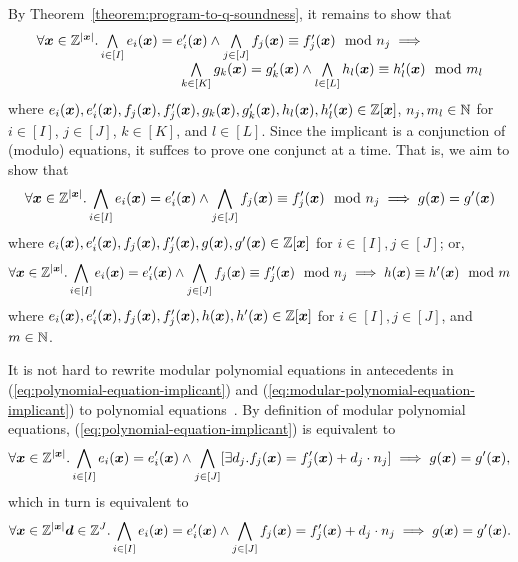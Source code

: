 
By Theorem~\ref{theorem:program-to-q-soundness}, it remains to show 
that 
\[
\begin{array}{l}
  \forall \vx \in \bbfZ^{|\vx|}.
  \bigwedge\limits_{i \in [I]} e_i (\vx) = e'_i (\vx) \wedge
  \bigwedge\limits_{j \in [J]} f_j (\vx) \equiv f'_j (\vx) \mod n_j
  \implies
  \\
  \hspace{.3\textwidth}
  \bigwedge\limits_{k \in [K]} g_k (\vx) = g'_k (\vx) \wedge
  \bigwedge\limits_{l \in [L]} h_l (\vx) \equiv h'_l (\vx) \mod m_l
\end{array}
\]
where
$e_i (\vx), e'_i (\vx), f_j (\vx), f'_j (\vx),
 g_k (\vx), g'_k (\vx), h_l (\vx), h'_l (\vx) \in
 \bbfZ[\vx]$, $n_j, m_l \in \mathbb{N}$ for $i \in [I]$, $j \in [J]$, $k
 \in [K]$, and $l \in [L]$. Since the
implicant is a conjunction of (modulo) equations, it suffces to 
prove one conjunct at a time. That is, we aim to show that 
\begin{equation}
  \label{eq:polynomial-equation-implicant}
  \forall \vx \in \bbfZ^{|\vx|}.
  \bigwedge\limits_{i \in [I]} e_i (\vx) = e'_i (\vx) \wedge
  \bigwedge\limits_{j \in [J]} f_j (\vx) \equiv f'_j (\vx) \mod n_j
  \implies
  g (\vx) = g' (\vx)
\end{equation}
where $e_i (\vx), e'_i (\vx), f_j (\vx), f'_j (\vx), g (\vx), g' (\vx)
\in \bbfZ[\vx]$ for $i \in [I], j \in [J]$; or, 
 \begin{equation}
   \label{eq:modular-polynomial-equation-implicant}
   \forall \vx \in \bbfZ^{|\vx|}.
   \bigwedge\limits_{i \in [I]} e_i (\vx) = e'_i (\vx) \wedge
   \bigwedge\limits_{j \in [J]} f_j (\vx) \equiv f'_j (\vx) \mod n_j
   \implies
   h (\vx) \equiv h' (\vx) \mod m
 \end{equation}
where $e_i (\vx), e'_i (\vx), f_j (\vx), f'_j (\vx), h (\vx), h' (\vx)
\in \bbfZ[\vx]$ for $i \in [I], j \in [J]$, and $m \in \mathbb{N}$. 

It is not hard to rewrite modular polynomial equations in antecedents
in (\ref{eq:polynomial-equation-implicant}) and 
(\ref{eq:modular-polynomial-equation-implicant}) to polynomial
equations~\cite{H:07:AENTP}. By definition of modular polynomial equations,
(\ref{eq:polynomial-equation-implicant}) is equivalent to
\[
\forall \vx \in \bbfZ^{|\vx|}.
\bigwedge\limits_{i \in [I]} e_i (\vx) = e'_i (\vx) \wedge
\bigwedge\limits_{j \in [J]} [\exists d_j. f_j (\vx) = f'_j (\vx) + d_j \cdot n_j]
\implies
g (\vx) = g' (\vx),
\]
which in turn is equivalent to
\[
\forall \vx \in \bbfZ^{|\vx|} \vd \in \bbfZ^{J}.
\bigwedge\limits_{i \in [I]} e_i (\vx) = e'_i (\vx) \wedge
\bigwedge\limits_{j \in [J]} f_j (\vx) = f'_j (\vx) + d_j \cdot n_j
\implies
g (\vx) = g' (\vx).
\]

